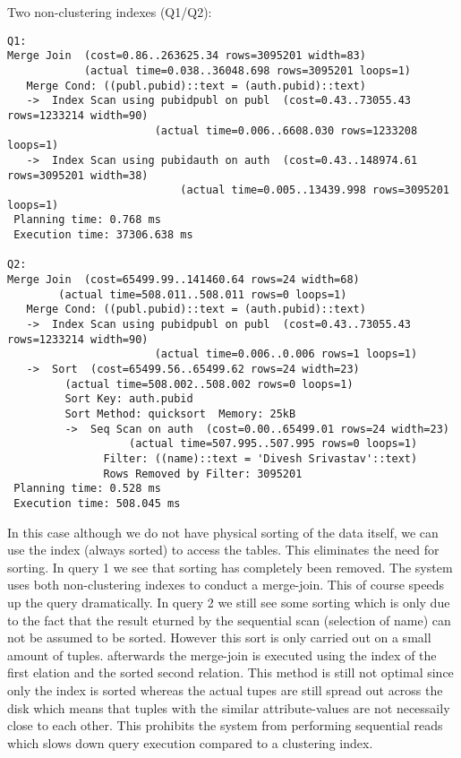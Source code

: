 \documentclass[11pt]{scrartcl}
\begin{document}
\noindent Two non-clustering indexes (Q1/Q2):
{\small
\begin{verbatim}
Q1:
Merge Join  (cost=0.86..263625.34 rows=3095201 width=83) 
            (actual time=0.038..36048.698 rows=3095201 loops=1)
   Merge Cond: ((publ.pubid)::text = (auth.pubid)::text)
   ->  Index Scan using pubidpubl on publ  (cost=0.43..73055.43 rows=1233214 width=90) 
					   (actual time=0.006..6608.030 rows=1233208 loops=1)
   ->  Index Scan using pubidauth on auth  (cost=0.43..148974.61 rows=3095201 width=38) 
				           (actual time=0.005..13439.998 rows=3095201 loops=1)
 Planning time: 0.768 ms
 Execution time: 37306.638 ms

Q2:
Merge Join  (cost=65499.99..141460.64 rows=24 width=68) 
	    (actual time=508.011..508.011 rows=0 loops=1)
   Merge Cond: ((publ.pubid)::text = (auth.pubid)::text)
   ->  Index Scan using pubidpubl on publ  (cost=0.43..73055.43 rows=1233214 width=90) 
					   (actual time=0.006..0.006 rows=1 loops=1)
   ->  Sort  (cost=65499.56..65499.62 rows=24 width=23) 
	     (actual time=508.002..508.002 rows=0 loops=1)
         Sort Key: auth.pubid
         Sort Method: quicksort  Memory: 25kB
         ->  Seq Scan on auth  (cost=0.00..65499.01 rows=24 width=23) 
			       (actual time=507.995..507.995 rows=0 loops=1)
               Filter: ((name)::text = 'Divesh Srivastav'::text)
               Rows Removed by Filter: 3095201
 Planning time: 0.528 ms
 Execution time: 508.045 ms
\end{verbatim}
In this case although we do not have physical sorting of the data itself, we can use the index (always sorted) to access the tables. This eliminates the need for sorting.
In query 1 we see that sorting has completely been removed. The system uses both non-clustering indexes to conduct a merge-join. This of course speeds up the query dramatically.
In query 2 we still see some sorting which is only due to the fact that the result eturned by the sequential scan (selection of name) can not be assumed to be sorted. However this sort
is only carried out on a small amount of tuples. afterwards the merge-join is executed using the index of the first elation and the sorted second relation.
This method is still not optimal since only the index is sorted whereas the actual tupes are still spread out across the disk which means that tuples with the similar attribute-values are not necessaily
close to each other. This prohibits the system from performing sequential reads which slows down query execution compared to a clustering index.
}
\end{document}
